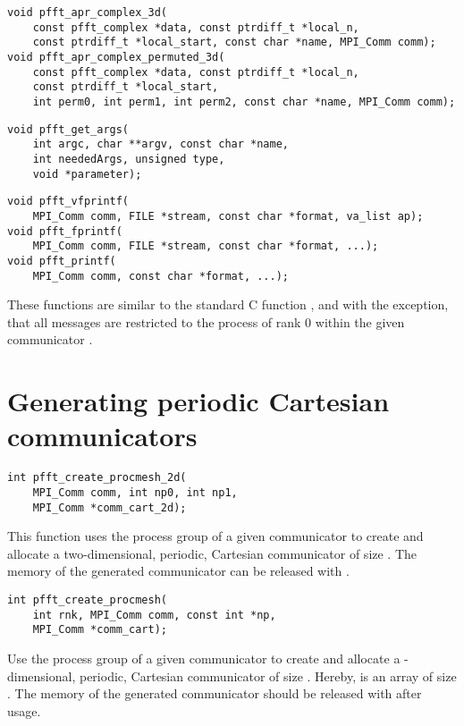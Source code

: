 \begin{lstlisting}
void pfft_apr_complex_3d(
    const pfft_complex *data, const ptrdiff_t *local_n,
    const ptrdiff_t *local_start, const char *name, MPI_Comm comm);
void pfft_apr_complex_permuted_3d(
    const pfft_complex *data, const ptrdiff_t *local_n,
    const ptrdiff_t *local_start,
    int perm0, int perm1, int perm2, const char *name, MPI_Comm comm);
\end{lstlisting}

\begin{lstlisting}
void pfft_get_args(
    int argc, char **argv, const char *name,
    int neededArgs, unsigned type,
    void *parameter);
\end{lstlisting}

\begin{lstlisting}
void pfft_vfprintf(
    MPI_Comm comm, FILE *stream, const char *format, va_list ap);
void pfft_fprintf(
    MPI_Comm comm, FILE *stream, const char *format, ...);
void pfft_printf(
    MPI_Comm comm, const char *format, ...);
\end{lstlisting}
These functions are similar to the standard C function ,  and  with the exception,
that all messages are restricted to the process of rank $0$ within the given communicator .

\section{Generating periodic Cartesian communicators}\label{sec:create-comm}
\begin{lstlisting}
int pfft_create_procmesh_2d(
    MPI_Comm comm, int np0, int np1,
    MPI_Comm *comm_cart_2d);
\end{lstlisting}
This function uses the process group of a given communicator  to create and allocate a
two-dimensional, periodic, Cartesian communicator  of size .
The memory of the generated communicator can be released with .
\begin{lstlisting}
int pfft_create_procmesh(
    int rnk, MPI_Comm comm, const int *np,
    MPI_Comm *comm_cart);
\end{lstlisting}
Use the process group of a given communicator  to create and allocate a
-dimensional, periodic, Cartesian communicator of size .
Hereby,  is an array of size .
The memory of the generated communicator should be released with  after usage.

